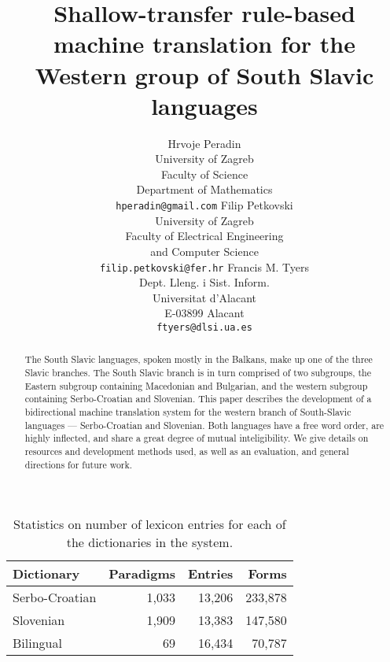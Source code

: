 \documentclass[11pt]{article}
\title{Shallow-transfer rule-based machine translation for the Western group of South Slavic languages}
\author{Hrvoje Peradin\\
  University of Zagreb\\
  Faculty of Science\\
  Department of Mathematics\\
  {\tt hperadin@gmail.com}  \And
  Filip Petkovski \\
  University of Zagreb\\
  Faculty of Electrical Engineering\\
  and Computer Science\\
  {\tt filip.petkovski@fer.hr}  \And
  Francis M. Tyers\\
  Dept. Lleng. i Sist. Inform.\\
  Universitat d'Alacant\\
  E-03899 Alacant\\
  {\tt ftyers@dlsi.ua.es}}
\date{}
\newcommand{\todo}[1]{\{\textbf{TODO: #1}\}}
\begin{document}
\maketitle
\begin{abstract}
The South Slavic languages, spoken mostly in the Balkans, make up one
of the three Slavic branches. The South Slavic branch is in turn
comprised of two subgroups, the Eastern subgroup containing Macedonian
and Bulgarian, and the western subgroup containing Serbo-Croatian
and Slovenian. This paper describes the development of a
bidirectional machine translation system for the western branch of
South-Slavic languages — Serbo-Croatian and Slovenian. Both
languages have a free word order, are highly inflected, and share a
great degree of mutual inteligibility. We give details on resources and
development methods used, as well as an evaluation, and
general directions for future work.
\end{abstract}








\begin{table}

\begin{center}
\begin{tabular}{|l|rrr|}
\hline
\textbf{Dictionary} & \textbf{Paradigms} & \textbf{Entries} & \textbf{Forms} \\
\hline
Serbo-Croatian &  1,033 & 13,206 & 233,878 \\
Slovenian &  1,909 & 13,383 & 147,580 \\
\hline
Bilingual &  69 &  16,434 & 70,787 \\
\hline
\end{tabular}
\caption{Statistics on number of lexicon entries for each of the dictionaries in the 
   system.}
\end{center}

\end{table}
\end{document}
